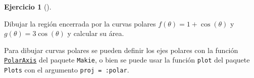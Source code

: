 \documentclass[
  a4paper,
]{scrreport}
\theoremstyle{definition}
\newtheorem{exercise}{Ejercicio}[chapter]
\theoremstyle{remark}
\begin{document}
\begin{exercise}[]\protect\hypertarget{exr-areas-curvas-polares}{}\label{exr-areas-curvas-polares}

Dibujar la región encerrada por la curvas polares
\(f(\theta)=1+\cos(\theta)\) y \(g(\theta) = 3\cos(\theta)\) y calcular
su área.

\end{exercise}

\begin{tcolorbox}[enhanced jigsaw, bottomtitle=1mm, rightrule=.15mm, left=2mm, colback=white, title=\textcolor{quarto-callout-note-color}{\faInfo}\hspace{0.5em}{Ayuda}, bottomrule=.15mm, colframe=quarto-callout-note-color-frame, toprule=.15mm, leftrule=.75mm, opacityback=0, coltitle=black, breakable, colbacktitle=quarto-callout-note-color!10!white, arc=.35mm, toptitle=1mm, titlerule=0mm, opacitybacktitle=0.6]

Para dibujar curvas polares se pueden definir los ejes polares con la
función
\href{https://docs.makie.org/stable/reference/blocks/polaraxis/}{\texttt{PolarAxis}}
del paquete \texttt{Makie}, o bien se puede usar la función
\texttt{plot} del paquete \texttt{Plots} con el argumento
\texttt{proj\ =\ :polar}.

\end{tcolorbox}
\end{document}
